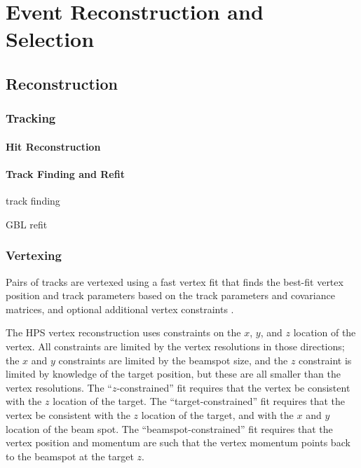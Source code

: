 \chapter{Event Reconstruction and Selection}

\section{Reconstruction}
\subsection{Tracking}
\label{sec:track_recon}

\subsubsection{Hit Reconstruction}
\label{sec:svt_hit_recon}

\subsubsection{Track Finding and Refit}
\label{sec:track_finding_refit}
track finding

GBL refit

\subsection{Vertexing}
\label{sec:vertex_recon}
Pairs of tracks are vertexed using a fast vertex fit that finds the best-fit vertex position and track parameters based on the track parameters and covariance matrices, and optional additional vertex constraints \cite{billoir_fast_1992}.

The HPS vertex reconstruction uses constraints on the $x$, $y$, and $z$ location of the vertex.
All constraints are limited by the vertex resolutions in those directions; the $x$ and $y$ constraints are limited by the beamspot size, and the $z$ constraint is limited by knowledge of the target position, but these are all smaller than the vertex resolutions.
The ``$z$-constrained'' fit requires that the vertex be consistent with the $z$ location of the target.
The ``target-constrained'' fit requires that the vertex be consistent with the $z$ location of the target, and with the $x$ and $y$ location of the beam spot.
The ``beamspot-constrained'' fit requires that the vertex position and momentum are such that the vertex momentum points back to the beamspot at the target $z$.

